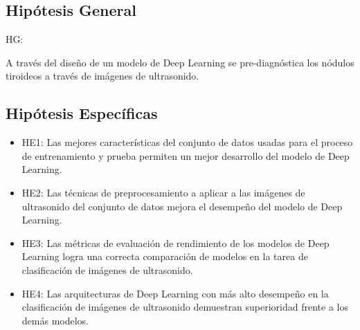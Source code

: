 \subsection{Hipótesis General}
HG: \newcommand{\HipotesisGeneral}{
A través del diseño de un modelo de Deep Learning se pre-diagnóstica los nódulos tiroideos a través de imágenes de ultrasonido.
}
\HipotesisGeneral


\subsection{Hipótesis Específicas}
\newcommand{\Hone}{
Las mejores características del conjunto de datos usadas para el proceso de entrenamiento y prueba permiten un mejor desarrollo del modelo de Deep Learning.
}
\newcommand{\Htwo}{
Las técnicas de preprocesamiento a aplicar a las imágenes de ultrasonido del conjunto de datos mejora el desempeño del modelo de Deep Learning.
}
\newcommand{\Hthree}{
Las métricas de evaluación de rendimiento de los modelos de Deep Learning logra una correcta comparación de modelos en la tarea de clasificación de imágenes de ultrasonido.
}
\newcommand{\Hfour}{
Las arquitecturas de Deep Learning con más alto desempeño en la clasificación de imágenes de ultrasonido demuestran superioridad frente a los demás modelos.
}

\begin{itemize}
	\item HE1: {\Hone}
	\item HE2: {\Htwo}
	\item HE3: {\Hthree}
	\item HE4: {\Hfour}
\end{itemize}